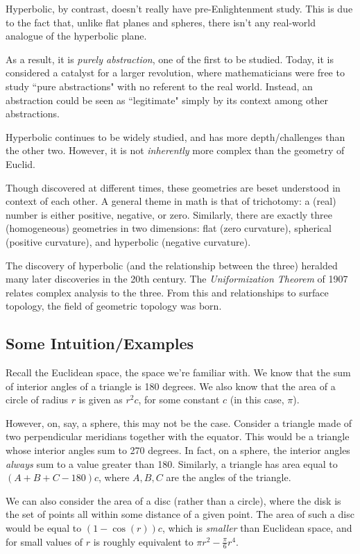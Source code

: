 \documentclass{article}
\begin{document}
Hyperbolic, by contrast, doesn't really have pre-Enlightenment study.
This is due to the fact that, unlike flat planes and spheres, there isn't any real-world analogue
of the hyperbolic plane.

As a result, it is \textit{purely abstraction}, one of the first to be studied.
Today, it is considered a catalyst for a larger revolution, where mathematicians were free to
study ``pure abstractions" with no referent to the real world. Instead, an abstraction could be
seen as ``legitimate" simply by its context among other abstractions.

Hyperbolic continues to be widely studied, and has more depth/challenges than the other two.
However, it is not \textit{inherently} more complex than the geometry of Euclid. \npgh

Though discovered at different times, these geometries are beset understood in context of each
other. A general theme in math is that of trichotomy: a (real) number is either positive, negative,
or zero. Similarly, there are exactly three (homogeneous) geometries in two dimensions: flat
(zero curvature), spherical (positive curvature), and hyperbolic (negative curvature).

The discovery of hyperbolic (and the relationship between the three) heralded many later discoveries
in the 20th century. The \textit{Uniformization Theorem} of 1907 relates complex analysis to the
three. From this and relationships to surface topology, the field of geometric topology was born.

\newpage
\subsection{Some Intuition/Examples}

Recall the Euclidean space, the space we're familiar with.
We know that the sum of interior angles of a triangle is 180 degrees.
We also know that the area of a circle of radius $ r $ is given as $ r^{2}c $, for some constant
$ c $ (in this case, $ \pi $).

However, on, say, a sphere, this may not be the case. Consider a triangle made of two perpendicular
meridians together with the equator. This would be a triangle whose interior angles sum to 270
degrees. In fact, on a sphere, the interior angles \textit{always} sum to a value greater than 180.
Similarly, a triangle has area equal to $ (A+B+C - 180)c $, where $ A,B,C $ are the angles of the
triangle.

We can also consider the area of a disc (rather than a circle), where the disk is the set of points
all within some distance of a given point. The area of such a disc would be equal to
$ (1-\cos(r))c $, which is \textit{smaller} than Euclidean space, and for small values of $ r $ is
roughly equivalent to $ \pi r^{2} - \frac{\pi}{6}r^{4} $.
\end{document}
